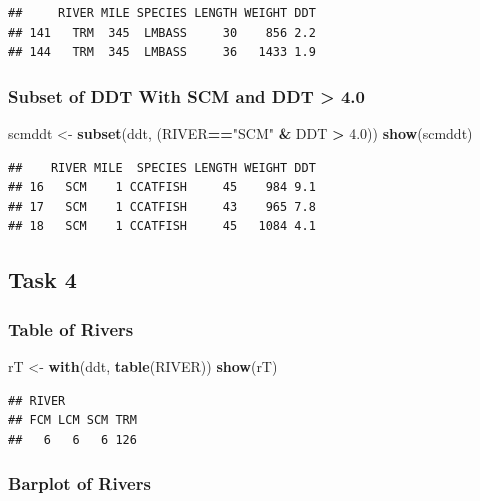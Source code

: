 \documentclass[]{article}
\newenvironment{Shaded}{\begin{snugshade}}{\end{snugshade}}
\newcommand{\KeywordTok}[1]{\textcolor[rgb]{0.13,0.29,0.53}{\textbf{#1}}}
\newcommand{\FloatTok}[1]{\textcolor[rgb]{0.00,0.00,0.81}{#1}}
\newcommand{\StringTok}[1]{\textcolor[rgb]{0.31,0.60,0.02}{#1}}
\newcommand{\OperatorTok}[1]{\textcolor[rgb]{0.81,0.36,0.00}{\textbf{#1}}}
\newcommand{\NormalTok}[1]{#1}
\begin{document}
\begin{verbatim}
##     RIVER MILE SPECIES LENGTH WEIGHT DDT
## 141   TRM  345  LMBASS     30    856 2.2
## 144   TRM  345  LMBASS     36   1433 1.9
\end{verbatim}

\subsubsection{Subset of DDT With SCM and DDT \textgreater{}
4.0}\label{subset-of-ddt-with-scm-and-ddt-4.0}

\begin{Shaded}
\begin{Highlighting}[]
\NormalTok{scmddt <-}\StringTok{ }\KeywordTok{subset}\NormalTok{(ddt, (RIVER}\OperatorTok{==}\StringTok{"SCM"} \OperatorTok{&}\StringTok{ }\NormalTok{DDT }\OperatorTok{>}\StringTok{ }\FloatTok{4.0}\NormalTok{))}
\KeywordTok{show}\NormalTok{(scmddt)}
\end{Highlighting}
\end{Shaded}

\begin{verbatim}
##    RIVER MILE  SPECIES LENGTH WEIGHT DDT
## 16   SCM    1 CCATFISH     45    984 9.1
## 17   SCM    1 CCATFISH     43    965 7.8
## 18   SCM    1 CCATFISH     45   1084 4.1
\end{verbatim}

\subsection{Task 4}\label{task-4}

\subsubsection{Table of Rivers}\label{table-of-rivers}

\begin{Shaded}
\begin{Highlighting}[]
\NormalTok{rT <-}\StringTok{ }\KeywordTok{with}\NormalTok{(ddt, }\KeywordTok{table}\NormalTok{(RIVER))}
\KeywordTok{show}\NormalTok{(rT)}
\end{Highlighting}
\end{Shaded}

\begin{verbatim}
## RIVER
## FCM LCM SCM TRM 
##   6   6   6 126
\end{verbatim}

\subsubsection{Barplot of Rivers}\label{barplot-of-rivers}
\end{document}
